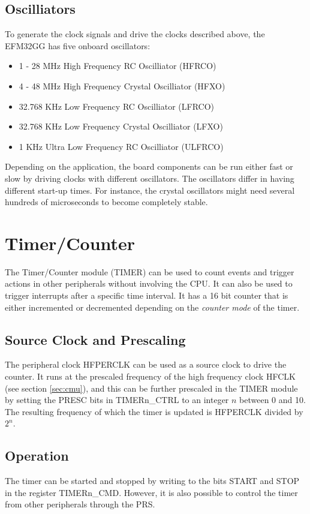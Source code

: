 \subsection{Oscilliators}
To generate the clock signals and drive the clocks described above, the EFM32GG has five onboard oscillators:
\begin{itemize}
  \item 1 - 28 MHz High Frequency RC Oscilliator (HFRCO)
  \item 4 - 48 MHz High Frequency Crystal Oscilliator (HFXO)
  \item 32.768 KHz Low Frequency RC Oscilliator (LFRCO)
  \item 32.768 KHz Low Frequency Crystal Oscilliator (LFXO)
  \item 1 KHz Ultra Low Frequency RC Oscilliator (ULFRCO)
\end{itemize}
Depending on the application, the board components can be run either fast or slow by driving clocks with different oscillators. The oscillators differ in having different start-up times. For instance, the crystal oscillators might need several hundreds of microseconds to become completely stable.\cite{efm32-clock-management-unit-application-note}


\section{Timer/Counter}
The Timer/Counter module (TIMER) can be used to count events and trigger actions in other peripherals without involving the CPU. It can also be used to trigger interrupts after a specific time interval. It has a 16 bit counter that is either incremented or decremented depending on the \emph{counter mode} of the timer.

\subsection{Source Clock and Prescaling} The peripheral clock HFPERCLK can be used as a source clock to drive the counter. It runs at the prescaled frequency of the high frequency clock HFCLK (see section \ref{sec:cmu}), and this can be further prescaled in the TIMER module by setting the PRESC bits in TIMERn\_CTRL to an integer $n$ between 0 and 10. The resulting frequency of which the timer is updated is HFPERCLK divided by $2^{n}$.

\subsection{Operation}
The timer can be started and stopped by writing to the bits START and STOP in the register TIMERn\_CMD. However, it is also possible to control the timer from other peripherals through the PRS.

